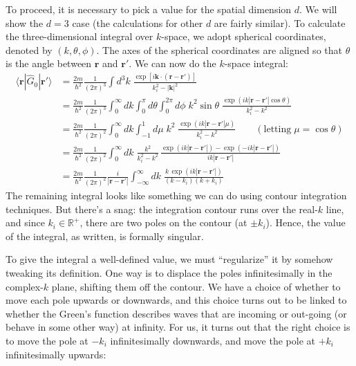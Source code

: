 \documentclass[pra,11pt]{revtex4}
\begin{document}
To proceed, it is necessary to pick a value for the spatial dimension $d$.  We
will show the $d = 3$ case (the calculations for other $d$ are fairly
similar).  To calculate the three-dimensional integral over $k$-space,
we adopt spherical coordinates, denoted by $(k,\theta,\phi)$.  The
axes of the spherical coordinates are aligned so that $\theta$ is the
angle between $\mathbf{r}$ and $\mathbf{r}'$.  We can now do the $k$-space
integral:
$$\begin{aligned}\langle\mathbf{r}|\hat{G}_0|\mathbf{r}'\rangle &= \frac{2m}{\hbar^2} \frac{1}{(2\pi)^3} \int d^3k \; \frac{\exp\left[i\mathbf{k}\cdot (\mathbf{r}-\mathbf{r}')\right]}{k_i^2-|\mathbf{k}|^2} \\ &= \frac{2m}{\hbar^2} \frac{1}{(2\pi)^3} \int_0^\infty dk \int_0^\pi d\theta \int_{0}^{2\pi} d\phi \;k^2\sin\theta\; \frac{\displaystyle \exp\left(ik|\mathbf{r}-\mathbf{r}'|\cos\theta\right)}{k_i^2-k^2} \\ &= \frac{2m}{\hbar^2} \frac{1}{(2\pi)^2} \int_0^\infty dk \int_{-1}^1 d\mu \;k^2\; \frac{\displaystyle \exp\left(ik|\mathbf{r}-\mathbf{r}'|\mu\right)}{k_i^2-k^2} \qquad(\text{letting}\;\mu = \cos\theta) \\ &= \frac{2m}{\hbar^2} \frac{1}{(2\pi)^2} \int_0^\infty dk \; \frac{ k^2}{k_i^2-k^2}\, \frac{\displaystyle \exp\left(ik|\mathbf{r}-\mathbf{r}'|\right) - \exp\left(-ik|\mathbf{r}-\mathbf{r}'|\right)}{ik|\mathbf{r}-\mathbf{r}'|} \\ &= \frac{2m}{\hbar^2} \frac{1}{(2\pi)^2} \frac{i}{|\mathbf{r}-\mathbf{r}'|} \int_{-\infty}^\infty dk \; \frac{\displaystyle k\, \exp\left(ik|\mathbf{r}-\mathbf{r}'|\right)}{(k - k_i)(k+k_i)}\end{aligned}$$
The remaining integral looks like something we can do using contour
integration techniques.  But there's a snag: the integration contour
runs over the real-$k$ line, and since $k_i \in \mathbb{R}^+$, there
are two poles on the contour (at $\pm k_i$).  Hence, the value of the
integral, as written, is formally singular.

To give the integral a well-defined value, we must ``regularize'' it
by somehow tweaking its definition.  One way is to displace the poles
infinitesimally in the complex-$k$ plane, shifting them off the
contour.  We have a choice of whether to move each pole upwards or
downwards, and this choice turns out to be linked to whether the
Green's function describes waves that are incoming or out-going (or
behave in some other way) at infinity.  For us, it turns out that the
right choice is to move the pole at $-k_i$ infinitesimally downwards,
and move the pole at $+k_i$ infinitesimally upwards:
\end{document}
